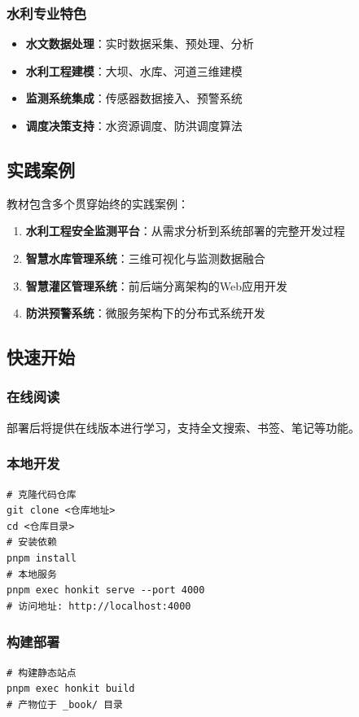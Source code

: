 \subsubsection{水利专业特色}\label{ux6c34ux5229ux4e13ux4e1aux7279ux8272} \begin{itemize} \tightlist \item
\textbf{水文数据处理}：实时数据采集、预处理、分析 \item \textbf{水利工程建模}：大坝、水库、河道三维建模 \item \textbf{监测系统集成}：传感器数据接入、预警系统 \item
\textbf{调度决策支持}：水资源调度、防洪调度算法 \end{itemize} \subsection{实践案例}\label{ux5b9eux8df5ux6848ux4f8b} 教材包含多个贯穿始终的实践案例：
\begin{enumerate} \def\labelenumi{\arabic{enumi}.} \tightlist \item \textbf{水利工程安全监测平台}：从需求分析到系统部署的完整开发过程 \item
\textbf{智慧水库管理系统}：三维可视化与监测数据融合 \item \textbf{智慧灌区管理系统}：前后端分离架构的Web应用开发 \item \textbf{防洪预警系统}：微服务架构下的分布式系统开发
\end{enumerate} \subsection{快速开始}\label{ux5febux901fux5f00ux59cb} \subsubsection{在线阅读}\label{ux5728ux7ebfux9605ux8bfb}
部署后将提供在线版本进行学习，支持全文搜索、书签、笔记等功能。 \subsubsection{本地开发}\label{ux672cux5730ux5f00ux53d1} \begin{lstlisting}
# 克隆代码仓库 
git clone <仓库地址> 
cd <仓库目录> 
# 安装依赖 
pnpm install 
# 本地服务 
pnpm exec honkit serve --port 4000 
# 访问地址: http://localhost:4000 
\end{lstlisting} 

\subsubsection{构建部署}\label{ux6784ux5efaux90e8ux7f72}
\begin{lstlisting}
# 构建静态站点 
pnpm exec honkit build 
# 产物位于 _book/ 目录 
\end{lstlisting}
